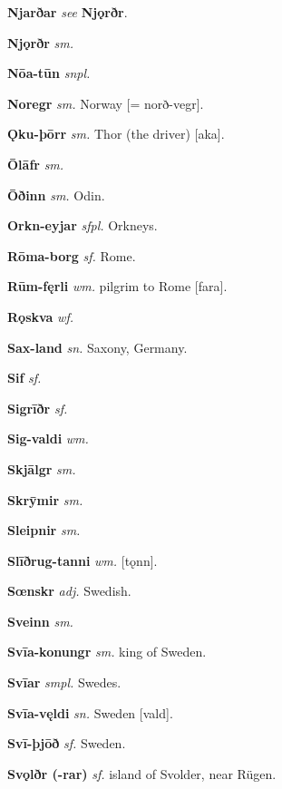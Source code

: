 \documentclass[12pt,letterpaper]{book}
\begin{document}
\noindent
\textbf{Njarðar} \textit{} \textit{see} \textbf{Njǫrðr}.

\noindent
\textbf{Njǫrðr} \textit{sm.} 

\noindent
\textbf{Nōa-tūn} \textit{snpl.} 

\noindent
\textbf{Noregr} \textit{sm.} Norway [= norð-vegr].

\vspace{\baselineskip}

\noindent
\textbf{Ǫku-þōrr} \textit{sm.} Thor (the driver) [aka].

\noindent
\textbf{Ōlāfr} \textit{sm.} 

\noindent
\textbf{Ōðinn} \textit{sm.} Odin.

\noindent
\textbf{Orkn-eyjar} \textit{sfpl.} Orkneys.

\vspace{\baselineskip}

\noindent
\textbf{Rōma-borg} \textit{sf.} Rome.

\noindent
\textbf{Rūm-fęrli} \textit{wm.} pilgrim to Rome [fara].

\noindent
\textbf{Rǫskva} \textit{wf.} 

\vspace{\baselineskip}

\noindent
\textbf{Sax-land} \textit{sn.} Saxony, Germany.

\noindent
\textbf{Sif} \textit{sf.} 

\noindent
\textbf{Sigrīðr} \textit{sf.} 

\noindent
\textbf{Sig-valdi} \textit{wm.} 

\noindent
\textbf{Skjālgr} \textit{sm.} 

\noindent
\textbf{Skrȳmir} \textit{sm.} 

\noindent
\textbf{Sleipnir} \textit{sm.} 

\noindent
\textbf{Slīðrug-tanni} \textit{wm.} [tǫnn].

\noindent
\textbf{Sœnskr} \textit{adj.} Swedish.

\noindent
\textbf{Sveinn} \textit{sm.} 

\noindent
\textbf{Svīa-konungr} \textit{sm.} king of Sweden.

\noindent
\textbf{Svīar} \textit{smpl.} Swedes.

\noindent
\textbf{Svīa-vęldi} \textit{sn.} Sweden [vald].

\noindent
\textbf{Svī-þjōð} \textit{sf.} Sweden.

\noindent
\textbf{Svǫlðr (-rar)} \textit{sf.} island of Svolder, near Rügen.
\end{document}
